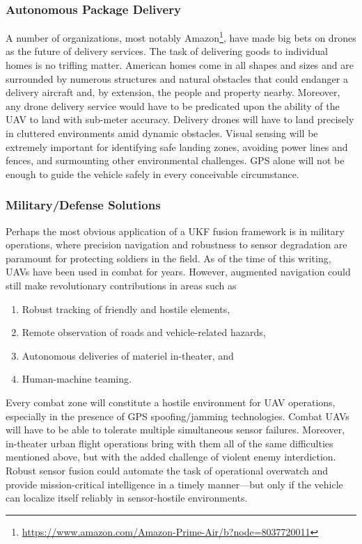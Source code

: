 \subsubsection{Autonomous Package Delivery}

A number of organizations, most notably Amazon\footnote{\url{https://www.amazon.com/Amazon-Prime-Air/b?node=8037720011}}, have made big bets on drones as the future of delivery services. The task of delivering goods to individual homes is no trifling matter. American homes come in all shapes and sizes and are surrounded by numerous structures and natural obstacles that could endanger a delivery aircraft and, by extension, the people and property nearby. Moreover, any drone delivery service would have to be predicated upon the ability of the UAV to land with sub-meter accuracy. Delivery drones will have to land precisely in cluttered environments amid dynamic obstacles. Visual sensing will be extremely important for identifying safe landing zones, avoiding power lines and fences, and surmounting other environmental challenges. GPS alone will not be enough to guide the vehicle safely in every conceivable circumstance. 

\subsubsection{Military/Defense Solutions}

Perhaps the most obvious application of a UKF fusion framework is in military operations, where precision navigation and robustness to sensor degradation are paramount for protecting soldiers in the field. As of the time of this writing, UAVs have been used in combat for years. However, augmented navigation could still make revolutionary contributions in areas such as
\begin{enumerate}
    \item Robust tracking of friendly and hostile elements,
    \item Remote observation of roads and vehicle-related hazards,
    \item Autonomous deliveries of materiel in-theater, and
    \item Human-machine teaming.
\end{enumerate}
Every combat zone will constitute a hostile environment for UAV operations, especially in the presence of GPS spoofing/jamming technologies. Combat UAVs will have to be able to tolerate multiple simultaneous sensor failures. Moreover, in-theater urban flight operations bring with them all of the same difficulties mentioned above, but with the added challenge of violent enemy interdiction. Robust sensor fusion could automate the task of operational overwatch and provide mission-critical intelligence in a timely manner---but only if the vehicle can localize itself reliably in sensor-hostile environments.

